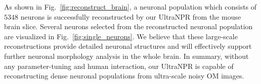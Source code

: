 As shown in Fig.~\ref{fig:reconstruct_brain}, a neuronal population which consists of $5348$ neurons is successfully reconstructed by our UltraNPR from the mouse brain slice. Several neurons selected from the reconstructed neuronal population are visualized in Fig.~\ref{fig:single_neurons}. 
We believe that these large-scale reconstructions provide detailed neuronal structures and will effectively support further neuronal morphology analysis in the whole brain. 
In summary, without any parameter-tuning and human interaction, our UltraNPR is capable of reconstructing dense neuronal populations from ultra-scale noisy OM images. 
